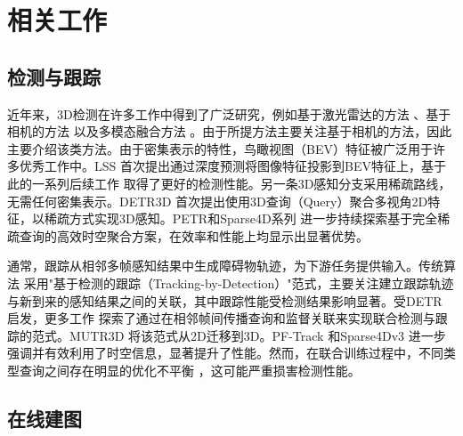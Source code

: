 \section{相关工作}
\label{sec:related}

\subsection{检测与跟踪}
\label{sec:related-det-mot}

近年来，3D检测在许多工作中得到了广泛研究，例如基于激光雷达的方法 \cite{yin2021center, chen2022focal, chen2023largekernel3d, chen2023voxelnext, zhang2023fully}、基于相机的方法 \cite{huang2021bevdet, li2022bevformer, liu2022petr, li2023bevdepth, wang2023exploring} 以及多模态融合方法 \cite{bai2022transfusion, liu2023bevfusion, yan2023cross}。由于所提方法主要关注基于相机的方法，因此主要介绍该类方法。由于密集表示的特性，鸟瞰视图（BEV）特征被广泛用于许多优秀工作中。LSS \cite{philion2020lift} 首次提出通过深度预测将图像特征投影到BEV特征上，基于此的一系列后续工作 \cite{huang2021bevdet, li2023bevdepth, li2022bevformer, yang2023bevformer, han2023exploring, li2023bevstereo} 取得了更好的检测性能。另一条3D感知分支采用稀疏路线，无需任何密集表示。DETR3D \cite{wang2022detr3d} 首次提出使用3D查询（Query）聚合多视角2D特征，以稀疏方式实现3D感知。PETR和Sparse4D系列 \cite{liu2022petr, liu2023petrv2, wang2023focal, yan2023cross, zhang2023fully, lin2022sparse4d, lin2023sparse4dv2, lin2023sparse4d} 进一步持续探索基于完全稀疏查询的高效时空聚合方案，在效率和性能上均显示出显著优势。

通常，跟踪从相邻多帧感知结果中生成障碍物轨迹，为下游任务提供输入。传统算法 \cite{weng20203d, yin2021center, wang2023exploring} 采用"基于检测的跟踪（Tracking-by-Detection）"范式，主要关注建立跟踪轨迹与新到来的感知结果之间的关联，其中跟踪性能受检测结果影响显著。受DETR \cite{codevilla2018end} 启发，更多工作 \cite{lin2021global, zeng2022motr, zhang2023motrv2, yu2023motrv3, sun2020transtrack, pang2022simpletrack, meinhardt2022trackformer} 探索了通过在相邻帧间传播查询和监督关联来实现联合检测与跟踪的范式。MUTR3D \cite{zhang2022mutr3d} 将该范式从2D迁移到3D。PF-Track \cite{pang2023standing} 和Sparse4Dv3 \cite{lin2023sparse4d} 进一步强调并有效利用了时空信息，显著提升了性能。然而，在联合训练过程中，不同类型查询之间存在明显的优化不平衡 \cite{yu2023motrv3}，这可能严重损害检测性能。

\subsection{在线建图}
\label{sec:related-mapping}

